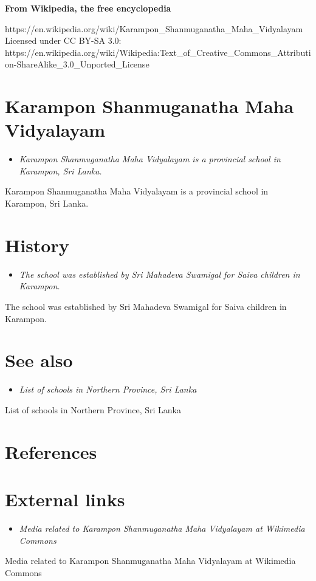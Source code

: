 \textbf{From Wikipedia, the free encyclopedia}

https://en.wikipedia.org/wiki/Karampon\_Shanmuganatha\_Maha\_Vidyalayam\\
Licensed under CC BY-SA 3.0:\\
https://en.wikipedia.org/wiki/Wikipedia:Text\_of\_Creative\_Commons\_Attribution-ShareAlike\_3.0\_Unported\_License

\section{Karampon Shanmuganatha Maha
Vidyalayam}\label{karampon-shanmuganatha-maha-vidyalayam}

\begin{itemize}
\item
  \emph{Karampon Shanmuganatha Maha Vidyalayam is a provincial school in
  Karampon, Sri Lanka.}
\end{itemize}

Karampon Shanmuganatha Maha Vidyalayam is a provincial school in
Karampon, Sri Lanka.

\section{History}\label{history}

\begin{itemize}
\item
  \emph{The school was established by Sri Mahadeva Swamigal for Saiva
  children in Karampon.}
\end{itemize}

The school was established by Sri Mahadeva Swamigal for Saiva children
in Karampon.

\section{See also}\label{see-also}

\begin{itemize}
\item
  \emph{List of schools in Northern Province, Sri Lanka}
\end{itemize}

List of schools in Northern Province, Sri Lanka

\section{References}\label{references}

\section{External links}\label{external-links}

\begin{itemize}
\item
  \emph{Media related to Karampon Shanmuganatha Maha Vidyalayam at
  Wikimedia Commons}
\end{itemize}

Media related to Karampon Shanmuganatha Maha Vidyalayam at Wikimedia
Commons
